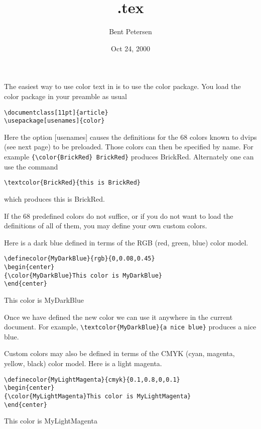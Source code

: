 \documentclass[11pt]{article}
\title{\color{Blue}\jobname.tex}
\author{Bent Petersen}
\date{Oct 24, 2000}
\begin{document}
\maketitle
\thispagestyle{empty}

The easiest way to use color text in \LaTeXe{} is to use the color
package. You load the color package in your preamble as usual
\begin{verbatim}
\documentclass[11pt]{article}
\usepackage[usenames]{color}
\end{verbatim}
Here the option [usenames] causes the definitions for the 68 colors
known to dvips (see next page) to be preloaded. Those colors can then
be specified by name. For example \verb={\color{BrickRed} BrickRed}= 
produces {\color{BrickRed} BrickRed}. Alternately one can use the 
command 
\begin{verbatim}
\textcolor{BrickRed}{this is BrickRed}
\end{verbatim}
which produces \textcolor{BrickRed}{this is BrickRed}.

If the 68 predefined colors do not suffice, or if you do not want
to load the definitions of all of them, you may define your own
custom colors.

Here is a dark blue defined in terms of the RGB (red, green, blue) color model.
\begin{verbatim}
\definecolor{MyDarkBlue}{rgb}{0,0.08,0.45}
\begin{center}
{\color{MyDarkBlue}This color is MyDarkBlue}
\end{center}
\end{verbatim}
\begin{center}
{\color{MyDarkBlue}This color is MyDarkBlue}
\end{center}
Once we have defined the new color we can use it anywhere in
the current document. For example, 
\verb=\textcolor{MyDarkBlue}{a nice blue}= produces
\textcolor{MyDarkBlue}{a nice blue}.

Custom colors may also be defined in terms of the CMYK 
(cyan, magenta, yellow, black) 
color model. Here is a light magenta.
\begin{verbatim}
\definecolor{MyLightMagenta}{cmyk}{0.1,0.8,0,0.1}
\begin{center}
{\color{MyLightMagenta}This color is MyLightMagenta}
\end{center}
\end{verbatim}
\begin{center}
{\color{MyLightMagenta}This color is MyLightMagenta}
\end{center}
\end{document}
